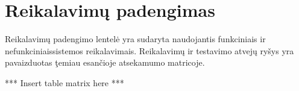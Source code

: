 \section{Reikalavimų padengimas}

Reikalavimų padengimo lentelė yra sudaryta naudojantis funkciniais ir nefunkciniaissistemos reikalavimais.
Reikalavimų ir testavimo atvejų ryšys yra pavaizduotas ţemiau esančioje atsekamumo matricoje.

*** Insert table matrix here ***